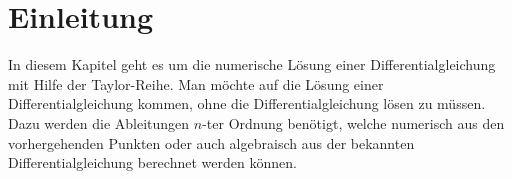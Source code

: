 %
%
%
\section{Einleitung
\label{taylor:section:einleitung}}
In diesem Kapitel geht es um die numerische Lösung einer Differentialgleichung mit Hilfe der Taylor-Reihe.
Man möchte auf die Lösung einer Differentialgleichung kommen, ohne die Differentialgleichung lösen zu müssen.
Dazu werden die Ableitungen $n$-ter Ordnung benötigt, welche numerisch aus den vorhergehenden Punkten oder auch algebraisch aus der bekannten Differentialgleichung berechnet werden können.

